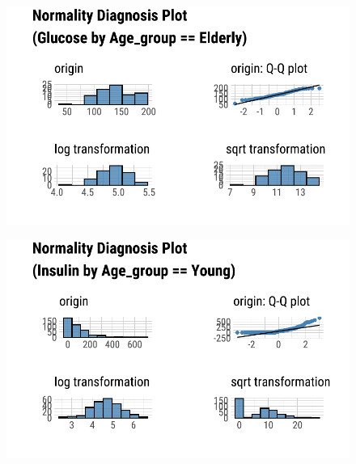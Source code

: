 \documentclass[
  letterpaper,
  DIV=11,
  numbers=noendperiod]{scrreprt}
\begin{document}
\begin{figure}[H]

{\centering \includegraphics{./TransformingLikeDataTrans_files/figure-pdf/unnamed-chunk-6-3.pdf}

}

\end{figure}

\begin{figure}[H]

{\centering \includegraphics{./TransformingLikeDataTrans_files/figure-pdf/unnamed-chunk-6-4.pdf}

}

\end{figure}
\end{document}
